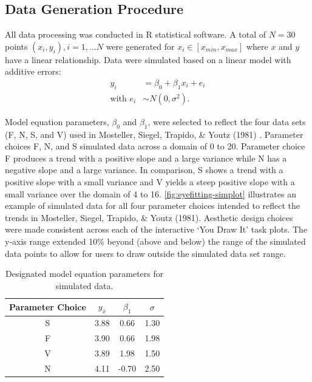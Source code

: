 \clearpage



\begin{appendix}
\clearpage
\appendix

\hypertarget{data-generation-procedure}{%
\section{\texorpdfstring{Data Generation Procedure
\label{app:data-generation}}{Data Generation Procedure }}\label{data-generation-procedure}}

All data processing was conducted in R statistical software. A total of
\(N = 30\) points \((x_i, y_i), i = 1,...N\) were generated for
\(x_i \in [x_{min}, x_{max}]\) where \(x\) and \(y\) have a linear
relationship. Data were simulated based on a linear model with additive
errors: \begin{align}
y_i & = \beta_0 + \beta_1 x_i + e_i \\
\text{with } e_i & \sim N(0, \sigma^2). \nonumber
\end{align}

Model equation parameters, \(\beta_0\) and \(\beta_1\), were selected to
reflect the four data sets (F, N, S, and V) used in Mosteller, Siegel,
Trapido, \& Youtz (1981) . Parameter
choices F, N, and S simulated data across a domain of 0 to 20. Parameter
choice F produces a trend with a positive slope and a large variance
while N has a negative slope and a large variance. In comparison, S
shows a trend with a positive slope with a small variance and V yields a
steep positive slope with a small variance over the domain of 4 to 16.
\cref{fig:eyefitting-simplot} illustrates an example of simulated data
for all four parameter choices intended to reflect the trends in
Mosteller, Siegel, Trapido, \& Youtz (1981). Aesthetic design choices
were made consistent across each of the interactive `You Draw It' task
plots. The y-axis range extended 10\% beyond (above and below) the range
of the simulated data points to allow for users to draw outside the
simulated data set range.

\begin{table}

\caption{\label{tab:eyefitting-parameters}Designated model equation parameters for simulated data.}
\centering
\begin{tabular}[t]{cccc}
\toprule
Parameter Choice & $y_{\bar{x}}$ & $\beta_1$ & $\sigma$\\
\midrule
S & 3.88 & 0.66 & 1.30\\
F & 3.90 & 0.66 & 1.98\\
V & 3.89 & 1.98 & 1.50\\
N & 4.11 & -0.70 & 2.50\\
\bottomrule
\end{tabular}
\end{table}


\end{appendix}
